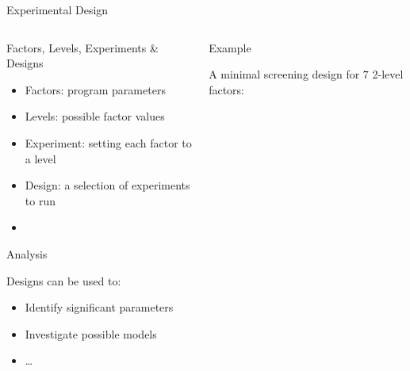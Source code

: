 \documentclass[10pt, compress, aspectratio=169, xcolor={table,usenames,dvipsnames}]{beamer}
\begin{document}
\begin{frame}[label={sec:orgdda44be}]{Experimental Design}
\begin{columns}
\begin{column}{0.5\columnwidth}
\begin{block}{Factors, Levels, Experiments \& Designs}
\vspace{.2cm}

\begin{itemize}
\item \alert{Factors}: program parameters
\item \alert{Levels}: possible factor values
\item \alert{Experiment}: setting each factor to a level
\item \alert{Design}: a selection of experiments to run
\item {}
\end{itemize}

\begin{block}{Analysis}
\vspace{.2cm}

Designs can be used to:

\begin{itemize}
\item Identify significant parameters
\item Investigate possible models
\item \dots{}
\end{itemize}
\end{block}
\end{block}
\end{column}

\begin{column}{0.5\columnwidth}
\begin{block}{Example}
\vspace{-.2cm}
\begin{center}

A minimal screening design for \(7\) 2-level factors:

\end{center}
\vspace{-.2cm}


\vspace{-.2cm}

\end{block}
\end{column}
\end{columns}
\end{frame}
\end{document}
